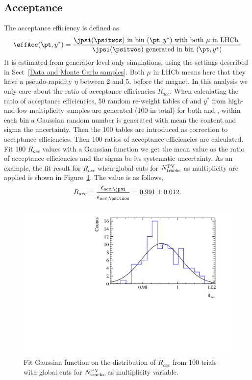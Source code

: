 \subsection{Acceptance}
The acceptance efficiency is defined as
\begin{equation}
    \effAcc(\pt,y^*)=\frac{\jpsi(\psitwos) \mathrm{ \ in \  bin \ } (\pt,y^*) \mathrm{ \ with  \ both \ } \mu \mathrm{ \ in \  LHCb \ }}{\jpsi(\psitwos) \mathrm{ \ generated \ in \ bin \ }(\pt,y^*)}
\end{equation}
 It is estimated from generator-level only simulations, using the settings described in Sect~\ref{Data and Monte Carlo samples}. Both $\mu$ in LHCb means here that they have a pseudo-rapidity $\eta$ between 2 and 5, before the magnet. In this analysis we only care about the ratio of acceptance efficiencies $R_{acc}$. When calculating the ratio of acceptance efficiencies, 50 random re-weight tables of \pt and $y^*$ from high- and low-multiplicity samples are generated (100 in total) for both \jpsi and \psitwos, within each bin a Gaussian random number is generated with mean the content and sigma the uncertainty. Then the 100 tables are introduced as correction to acceptance efficiencies. Then 100 ratios of acceptance efficiencies are calculated. Fit 100 $R_{acc}$ values with a Gaussian function we get the mean value as the ratio of acceptance efficiencies and the sigma be its systematic uncertainty. As an example, the fit result for $R_{acc}$ when global cuts for $N^{\rm PV}_{\rm tracks}$ as multiplicity are applied is shown in Figure~\ref{EffAccRatio}. The value is as follows,
\begin{equation}
	R_{acc}=\frac{\ensuremath{\epsilon_{\mathrm{acc,\jpsi}}}}{\ensuremath{\epsilon_{\mathrm{acc,\psitwos}}}}=0.991\pm 0.012.
\end{equation}
\begin{figure}[H]
\begin{center}
\includegraphics[width=0.5\linewidth]{pdf/pPb/Workdir/Eff_RecselPIDTrigger/Racc.pdf}
\end{center}
\caption{
	Fit Gaussian function on the distribution of $R_{acc}$ from 100 trials with global cuts for $N^{\rm PV}_{\rm tracks}$ as multiplicity variable.}
\label{EffAccRatio}
\end{figure}


